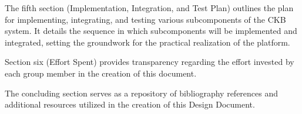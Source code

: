 The fifth section (Implementation, Integration, and Test Plan) outlines the plan for implementing, integrating, and testing various subcomponents of the CKB system. 
It details the sequence in which subcomponents will be implemented and integrated, setting the groundwork for the practical realization of the platform.

Section six (Effort Spent) provides transparency regarding the effort invested by each group member in the creation of this document. 

The concluding section serves as a repository of bibliography references and additional resources utilized in the creation of this Design Document. 
